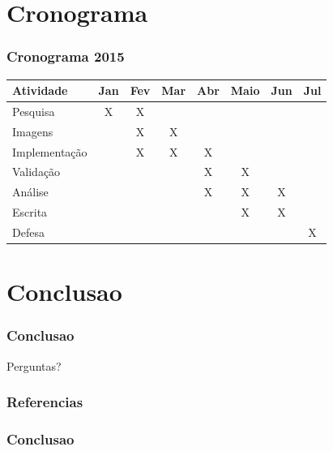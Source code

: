 \documentclass{beamer}
\begin{document}
\section{Cronograma}
\begin{frame}
\frametitle{Cronograma 2015}
%
\begin{tabular}{|l|c|c|c|c|c|c|c|}
\hline
Atividade & Jan & Fev & Mar & Abr & Maio & Jun & Jul \\
\hline
Pesquisa & X & X & & & & &  \\
\hline
Imagens &  & X & X &  &  &  &   \\
\hline
Implementação&  & X & X & X &  &  &   \\
\hline
Validação &   &   &  & X & X &  &   \\
\hline
Análise &   &   &  & X & X & X &   \\
\hline
Escrita  &   &   &  &  & X & X &   \\
\hline
Defesa  &   &   &  &  &  &  & X  \\
\hline
\end{tabular}
%



\end{frame}




\section{Conclusao}
\begin{frame}
\frametitle{Conclusao}
\huge
Perguntas?

\end{frame}


\begin{frame}[allowframebreaks]
\frametitle{Referencias}



\end{frame}




\begin{frame}
\frametitle{Conclusao}
\huge
\cite{bong2008integrated} \cite{chen2012dynamic} \cite{de2006introduccao} \cite{delibaltov2013parking}\cite{gonzalez2009digital}
\cite{graciano2007rastreamento} \cite{hai2009self} \cite{IBGE2000introducao} \cite{idris09} \cite{marques1999processamento}
\cite{true2007vacant} \cite{vkl1989jain}
\end{frame}


\end{document}
